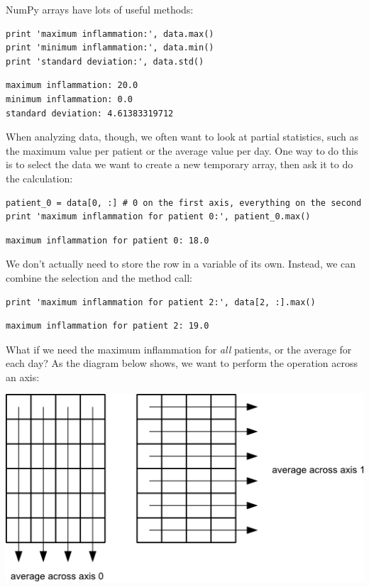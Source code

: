 \documentclass[]{book}
\begin{document}
NumPy arrays have lots of useful methods:

\begin{verbatim}
print 'maximum inflammation:', data.max()
print 'minimum inflammation:', data.min()
print 'standard deviation:', data.std()
\end{verbatim}

\begin{verbatim}
maximum inflammation: 20.0
minimum inflammation: 0.0
standard deviation: 4.61383319712
\end{verbatim}

When analyzing data, though, we often want to look at partial
statistics, such as the maximum value per patient or the average value
per day. One way to do this is to select the data we want to create a
new temporary array, then ask it to do the calculation:

\begin{verbatim}
patient_0 = data[0, :] # 0 on the first axis, everything on the second
print 'maximum inflammation for patient 0:', patient_0.max()
\end{verbatim}

\begin{verbatim}
maximum inflammation for patient 0: 18.0
\end{verbatim}

We don't actually need to store the row in a variable of its own.
Instead, we can combine the selection and the method call:

\begin{verbatim}
print 'maximum inflammation for patient 2:', data[2, :].max()
\end{verbatim}

\begin{verbatim}
maximum inflammation for patient 2: 19.0
\end{verbatim}

What if we need the maximum inflammation for \emph{all} patients, or the
average for each day? As the diagram below shows, we want to perform the
operation across an axis:

\includegraphics{novice/python/img/python-operations-across-axes.png}
\end{document}
